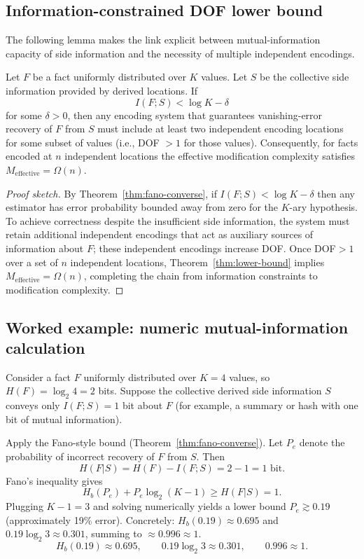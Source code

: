 \subsection{Information-constrained DOF lower bound}
\label{sec:info-dof}

The following lemma makes the link explicit between mutual-information capacity of side information and the necessity of multiple independent encodings.

\begin{lemma}\label{lem:info-dof}
Let $F$ be a fact uniformly distributed over $K$ values. Let $S$ be the collective side information provided by derived locations. If
\[I(F;S) < \log K - \delta\]
for some $\delta>0$, then any encoding system that guarantees vanishing-error recovery of $F$ from $S$ must include at least two independent encoding locations for some subset of values (i.e., DOF $>1$ for those values). Consequently, for facts encoded at $n$ independent locations the effective modification complexity satisfies $M_{\text{effective}}=\Omega(n)$.
\end{lemma}

\begin{proof}[Proof sketch]
By Theorem~\ref{thm:fano-converse}, if $I(F;S)<\log K-\delta$ then any estimator has error probability bounded away from zero for the $K$-ary hypothesis. To achieve correctness despite the insufficient side information, the system must retain additional independent encodings that act as auxiliary sources of information about $F$; these independent encodings increase DOF. Once DOF$>1$ over a set of $n$ independent locations, Theorem~\ref{thm:lower-bound} implies $M_{\text{effective}}=\Omega(n)$, completing the chain from information constraints to modification complexity.
\end{proof}

\subsection{Worked example: numeric mutual-information calculation}
\label{sec:worked-mi}

Consider a fact $F$ uniformly distributed over $K=4$ values, so $H(F)=\log_2 4 = 2$ bits. Suppose the collective derived side information $S$ conveys only $I(F;S)=1$ bit about $F$ (for example, a summary or hash with one bit of mutual information).

Apply the Fano-style bound (Theorem~\ref{thm:fano-converse}). Let $P_e$ denote the probability of incorrect recovery of $F$ from $S$. Then
\[
H(F|S) = H(F)-I(F;S) = 2 - 1 = 1\text{ bit.}
\]
Fano's inequality gives
\[
H_b(P_e) + P_e\log_2(K-1) \ge H(F|S) = 1.
\]
Plugging $K-1=3$ and solving numerically yields a lower bound $P_e \gtrsim 0.19$ (approximately 19\% error). Concretely: $H_b(0.19)\approx 0.695$ and $0.19\log_2 3\approx 0.301$, summing to $\approx 0.996\approx1$.
\[
H_b(0.19)\approx 0.695,\qquad
0.19\log_2 3\approx 0.301,\qquad
0.996\approx 1.
\]

